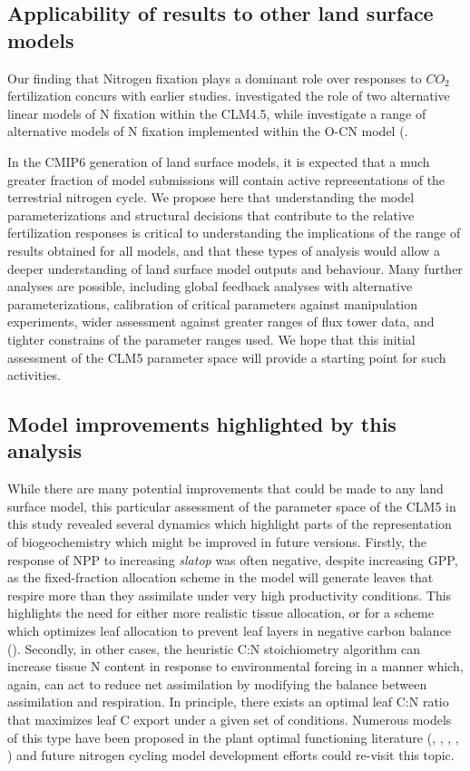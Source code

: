 \documentclass[draft,linenumbers]{agujournal}
\begin{document}
\subsection{Applicability of results to other land surface models}
Our finding that Nitrogen fixation plays a dominant role over responses to $CO_{2}$ fertilization concurs with earlier studies. \cite{wieder2015} investigated the role of two alternative linear models of N fixation within the CLM4.5, while \cite{meyerholt2015} investigate a range of alternative models of N fixation implemented within the O-CN model (\cite{zaehle2010}. 


In the CMIP6 generation of land surface models, it is expected that a much greater fraction of model submissions will contain active representations of the terrestrial nitrogen cycle. We propose here that understanding the model parameterizations and structural decisions that contribute to the relative fertilization responses is critical to understanding the implications of the range of results obtained for all models, and that these types of analysis would allow a deeper understanding of land surface model outputs and behaviour. Many further analyses are possible, including global feedback analyses with alternative parameterizations, calibration of critical parameters against manipulation experiments, wider assessment against greater ranges of flux tower data, and tighter constrains of the parameter ranges used. We hope that this initial assessment of the CLM5 parameter space will provide a starting point for such activities. 

\subsection{Model improvements highlighted by this analysis}
While there are many potential improvements that could be made to any land surface model, this particular assessment of the parameter space of the CLM5 in this study revealed several dynamics which highlight parts of the representation of biogeochemistry which might be improved in future versions.  Firstly, the response of NPP to increasing \emph{slatop} was often negative, despite increasing GPP, as the fixed-fraction allocation scheme in the model will generate leaves that respire more than they assimilate under very high productivity conditions. This highlights the need for either more realistic tissue allocation, or for a scheme which optimizes leaf allocation to prevent leaf layers in negative carbon balance (\cite{fisher2010}).  Secondly, in other cases, the heuristic C:N stoichiometry algorithm can increase tissue N content in response to environmental forcing in a manner which, again, can act to reduce net assimilation by modifying the balance between assimilation and respiration. In principle, there exists an optimal leaf C:N ratio that maximizes leaf C export under a given set of conditions.  Numerous models of this type have been proposed in the plant optimal functioning literature (\cite{vanwijk2003}, \cite{mcmurtrie2011}, \cite{anten2011} \cite{franklin2012}, \cite{mcmurtrie2013}, \cite{thomas2014}) and future nitrogen cycling model development efforts could re-visit this topic.  
\end{document}

